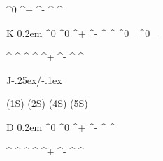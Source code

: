 

\newmathsymbol{\pion}        {\pi}
\newmathsymbol{\piz}         {\pion^0}
\newmathsymbol{\pip}         {\pion^+}
\newmathsymbol{\pim}         {\pion^-}
\newmathsymbol{\pipm}        {\pion^\pm}
\newmathsymbol{\pimp}        {\pion^\mp}
\newmathsymbol{\pipi}        {\pip\pim}

\newmathsymbol{\kaon}        {K}
\newmathsymbol{\Kaon}        {\kaon}
\newmathsymbol{\Kbar}        {\kern 0.2em\ovE{\kern -0.2em \kaon}{}}
\newmathsymbol{\Kz}          {\kaon^0}
\newmathsymbol{\Kzbar}       {\Kbar^0}
\newmathsymbol{\Kp}          {\kaon^+}
\newmathsymbol{\Km}          {\kaon^-}
\newmathsymbol{\Kpm}         {\kaon^\pm}
\newmathsymbol{\Kmp}         {\kaon^\mp}
\newmathsymbol{\KK}          {\Kp\Km}
\newmathsymbol{\KS}          {\kaon^0_{}} 
\newmathsymbol{\KL}          {\kaon^0_{}} 

\newmathsymbol{\Kstar}       {\kaon^\ast}
\newmathsymbol{\Kstarbar}    {\Kbar^\ast}
\newmathsymbol{\Kstarz}      {\kaon^{}}
\newmathsymbol{\Kstarzbar}   {\Kbar^{}}
\newmathsymbol{\Kstarp}      {\kaon^{\ast +}}
\newmathsymbol{\Kstarm}      {\kaon^{\ast -}}
\newmathsymbol{\Kstarpm}     {\kaon^{\ast \pm}}
\newmathsymbol{\Kstarmp}     {\kaon^{\ast \mp}}

\newmathsymbol{\jpsi}        {J\kern-.25ex/\kern-.1ex\psi}
\newmathsymbol{\Jpsi}        {\jpsi}
\newmathsymbol{\psitwos}     {}

\newmathsymbol{\YOneS}  {\Upsilon(1S)}
\newmathsymbol{\YTwoS}  {\Upsilon(2S)}
\newmathsymbol{\YFourS} {\Upsilon(4S)}
\newmathsymbol{\YFiveS} {\Upsilon(5S)}

\newmathsymbol{\D}           {D}
\newmathsymbol{\Dbar}        {\kern 0.2em\ovE{\kern -0.2em \D}{}}
\renewmathsymbol{\Dz}        {\D^0}
\newmathsymbol{\Dzbar}       {\Dbar^0}
\newmathsymbol{\Dp}          {\D^+}
\newmathsymbol{\Dm}          {\D^-}
\newmathsymbol{\Dpm}         {\D^\pm}
\newmathsymbol{\Dmp}         {\D^\mp}

\newmathsymbol{\Dstar}       {\D^\ast}
\newmathsymbol{\Dstarbar}    {\Dbar^\ast}
\newmathsymbol{\Dstarz}      {\D^{}}
\newmathsymbol{\Dstarzbar}   {\Kb^{}}
\newmathsymbol{\Dstarp}      {\D^{\ast +}}
\newmathsymbol{\Dstarm}      {\D^{\ast -}}
\newmathsymbol{\Dstarpm}     {\D^{\ast \pm}}
\newmathsymbol{\Dstarmp}     {\D^{\ast \mp}}

